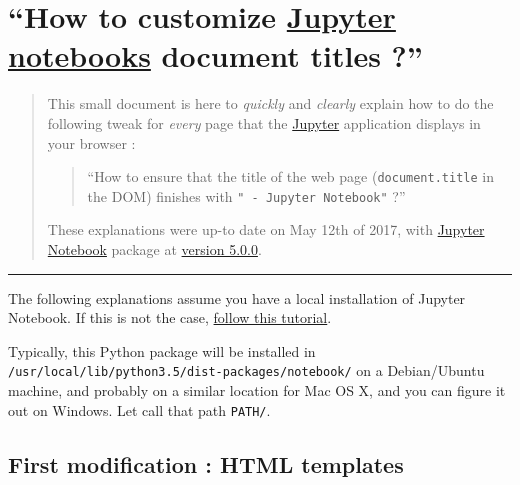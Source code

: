 \documentclass[]{article}
\date{}
\begin{document}
\section{\texorpdfstring{``How to customize
\href{https://www.Jupyter.org/}{Jupyter notebooks} document titles
?''}{How to customize Jupyter notebooks document titles ?}}\label{how-to-customize-jupyter-notebooks-document-titles}

\begin{quote}
This small document is here to \emph{quickly} and \emph{clearly} explain
how to do the following tweak for \emph{every} page that the
\href{https://www.Jupyter.org/}{Jupyter} application displays in your
browser :

\begin{quote}
``How to ensure that the title of the web page (\texttt{document.title}
in the DOM) finishes with \texttt{" - Jupyter Notebook"} ?''
\end{quote}

These explanations were up-to date on May 12th of 2017, with
\href{https://github.com/jupyter/notebook/}{Jupyter Notebook} package at
\href{https://github.com/jupyter/notebook/releases/tag/5.0.0}{version
5.0.0}.
\end{quote}

\begin{center}\rule{0.5\linewidth}{\linethickness}\end{center}

The following explanations assume you have a local installation of
Jupyter Notebook. If this is not the case,
\href{https://jupyter.readthedocs.io/en/latest/install.html}{follow this
tutorial}.

Typically, this Python package will be installed in
\texttt{/usr/local/lib/python3.5/dist-packages/notebook/} on a
Debian/Ubuntu machine, and probably on a similar location for Mac OS X,
and you can figure it out on Windows. Let call that path \texttt{PATH/}.

\subsection{First modification : HTML
templates}\label{first-modification-html-templates}
\end{document}
